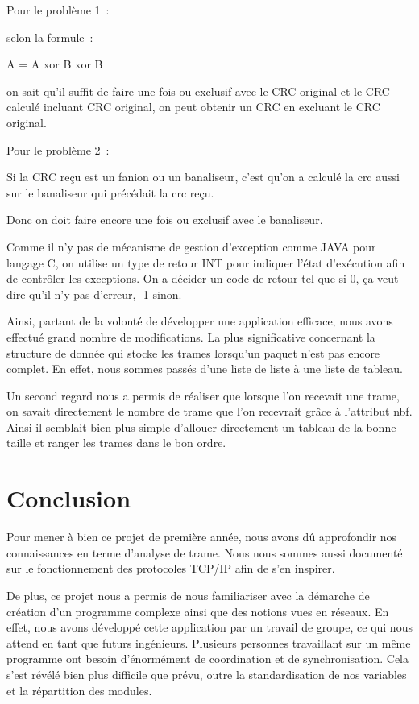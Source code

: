 \documentclass[a4paper,11pt]{article}
\begin{document}
\vspace{0.5cm}

Pour le problème 1 :

selon la formule :

A = A xor B xor B

on sait qu'il suffit de faire une fois ou exclusif avec le CRC original et le CRC calculé incluant CRC original, on peut obtenir un CRC  en excluant le CRC original.

Pour le problème 2 :

Si la CRC reçu est un fanion ou un banaliseur, c'est qu'on a
 calculé la crc aussi sur le banaliseur qui précédait la crc reçu.

Donc on doit faire encore une fois ou exclusif avec le banaliseur.


Comme il n'y pas de mécanisme de gestion d'exception comme JAVA pour langage C, on utilise un type de retour INT pour indiquer l'état d'exécution afin de contrôler les exceptions.
On a décider un code de retour tel que si 0, ça veut dire qu'il n'y pas d'erreur, -1 sinon.

\vspace{0.5cm}

Ainsi, partant de la volonté de développer une application efficace, nous avons effectué grand nombre de modifications. La plus significative concernant la structure de donnée qui stocke les trames lorsqu'un paquet n'est pas encore complet. En effet, nous sommes passés d'une liste de liste à une liste de tableau.

Un second regard nous a permis de réaliser que lorsque l'on recevait une trame, on savait directement le nombre de trame que l'on recevrait grâce à l'attribut nbf. Ainsi il semblait bien plus simple d'allouer directement un tableau de la bonne taille et ranger les trames dans le bon ordre.

\section{Conclusion}

Pour mener à bien ce projet de première année, nous avons dû approfondir nos connaissances en terme d'analyse de trame. Nous nous sommes aussi documenté sur le fonctionnement des protocoles TCP/IP afin de s'en inspirer.

De plus, ce projet nous a permis de nous familiariser avec la démarche de création d’un programme complexe ainsi  que des notions vues en réseaux. En effet, nous avons développé cette application par un travail de groupe, ce qui nous attend en tant que futurs ingénieurs. Plusieurs personnes travaillant sur un même programme ont besoin d'énormément de coordination et de synchronisation. Cela s'est révélé bien plus difficile que prévu, outre la standardisation de nos variables et la répartition des modules.
\end{document}
